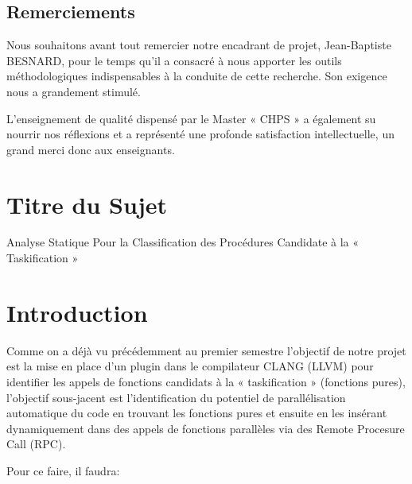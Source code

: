 \documentclass[12pt,a4paper]{article}
\begin{document}
\begin{center}
	\begin{minipage}{13cm}


\section*{ \huge \bfseries \center Remerciements}
Nous souhaitons avant tout remercier notre encadrant de projet, Jean-Baptiste BESNARD, pour le temps qu’il a consacré à nous apporter les outils méthodologiques indispensables à la conduite de cette recherche. Son exigence nous a grandement stimulé.

L’enseignement de qualité dispensé par le Master « CHPS » a également su nourrir nos réflexions et a représenté une profonde satisfaction intellectuelle, un grand merci donc aux enseignants.

	\end{minipage}
\end{center}





\pagebreak
\listoffigures

\tableofcontents

\pagebreak

\section{Titre du Sujet}

Analyse Statique Pour la Classification des Procédures Candidate à la « Taskification »

\section{Introduction}

Comme on a déjà vu précédemment au premier semestre l'objectif de notre projet est la mise en place d’un plugin dans le compilateur CLANG (LLVM) pour identifier les appels de fonctions candidats à la « taskification » (fonctions pures), l'objectif sous-jacent est l'identification du potentiel de parallélisation automatique du code en trouvant les fonctions pures et ensuite en les insérant dynamiquement dans des appels de fonctions parallèles via des Remote Procesure Call (RPC).

Pour ce faire, il faudra: 
\end{document}
